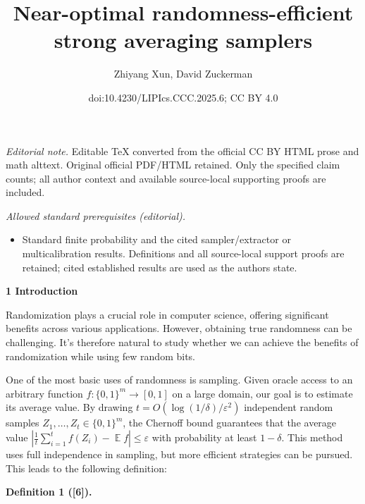 \documentclass[10pt,a4paper]{article}
\title{Near-optimal randomness-efficient strong averaging samplers}
\author{Zhiyang Xun, David Zuckerman}
\date{doi:10.4230/LIPIcs.CCC.2025.6; CC BY 4.0}
\begin{document}
\maketitle
\noindent\textit{Editorial note.} Editable TeX converted from the official CC BY HTML prose and math alttext. Original official PDF/HTML retained. Only the specified claim counts; all author context and available source-local supporting proofs are included.\par\medskip
\noindent\textit{Allowed standard prerequisites (editorial).}\begin{itemize}
\item Standard finite probability and the cited sampler/extractor or multicalibration results. Definitions and all source-local support proofs are retained; cited established results are used as the authors state.
\end{itemize}\medskip


\par\medskip\noindent\textbf{
1 Introduction}\par




Randomization plays a crucial role in computer science, offering significant benefits across various applications. However, obtaining true randomness can be challenging.
It’s therefore natural to study whether we can achieve the benefits of randomization while using few random bits.\par




One of the most basic uses of randomness is sampling.
Given oracle access to an arbitrary function $f:\{0,1\}^{m}\to[0,1]$ on a large domain, our goal is to estimate its average value.
By drawing $t=O(\log(1/\delta)/\varepsilon^{2})$ independent random samples $Z_{1},\dots,Z_{t}\in\{0,1\}^{m}$,
the Chernoff bound guarantees that the average value $\left|\frac{1}{t}\sum_{i=1}^{t}f(Z_{i})-\operatorname*{\mathbb{E}}f\right|\leq\varepsilon$ with probability at least $1-\delta$. This method uses full independence in sampling, but more efficient strategies can be pursued. This leads to the following definition:\par





\par\medskip\noindent\textbf{
\textbf{Definition 1}\textbf{ }([6])\textbf{.}
}\par
\end{document}
